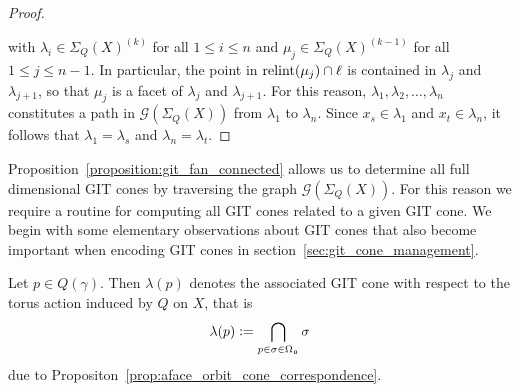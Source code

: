 \begin{proof}
\begin{center}
	\end{center}
	
	with $\lambda_i\in\Sigma_Q(X)^{(k)}$ for all $1\leq i \leq n$ and $\mu_j\in\Sigma_Q(X)^{(k-1)}$ for all $1\leq j \leq n-1$. In particular, the point in $\text{relint}(\mu_j)\cap \ell$ is contained in $\lambda_j$ and $\lambda_{j+1}$, so that $\mu_j$ is a facet of $\lambda_j$ and $\lambda_{j+1}$. For this reason, $\lambda_1,\lambda_2,\dots,\lambda_n$ constitutes a path in $\mathcal{G}(\Sigma_Q(X))$ from $\lambda_1$ to $\lambda_n$. Since $x_s\in\lambda_1$ and $x_t\in\lambda_n$, it follows that $\lambda_1 = \lambda_s$ and $\lambda_n = \lambda_t$.
\end{proof}

Proposition~\ref{proposition:git_fan_connected} allows us to determine all full dimensional GIT cones by traversing the graph $\mathcal{G}(\Sigma_Q(X))$. For this reason we require a routine for computing all GIT cones related to a given GIT cone. We begin with some elementary observations about GIT cones that also become important when encoding GIT cones in section~\ref{sec:git_cone_management}.

\begin{notation}
	Let $p\in Q(\gamma)$. Then $\lambda(p)$ denotes the associated GIT cone with respect to the torus action induced by $Q$ on $X$, that is
	$$\lambda(p) \mathrel{\mathop:}= \bigcap_{p\in\sigma\in\Omega_{\mathfrak{a}}} \sigma$$
	due to Propositon~\ref{prop:aface_orbit_cone_correspondence}.
\end{notation}

